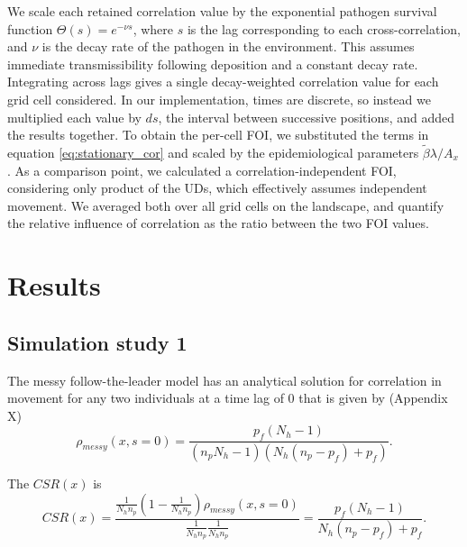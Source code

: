 \documentclass[letterpaper]{article}
\begin{document}
We scale each retained correlation value by the exponential pathogen survival function $\Theta(s) = e^{-\nu s}$, where $s$ is the lag corresponding to each cross-correlation, and $\nu$ is the decay rate of the pathogen in the environment. This assumes immediate transmissibility following deposition and a constant decay rate. Integrating across lags gives a single decay-weighted correlation value for each grid cell considered. In our implementation, times are discrete, so instead we multiplied each value by $ds$, the interval between successive positions, and added the results together. To obtain the per-cell FOI, we substituted the terms in equation \ref{eq:stationary_cor} and scaled by the epidemiological parameters $\tilde\beta\lambda/ A_x$. As a comparison point, we calculated a correlation-independent FOI, considering only product of the UDs, which effectively assumes independent movement. We averaged both over all grid cells on the landscape, and quantify the relative influence of correlation as the ratio between the two FOI values. %

\section*{Results}

\subsection*{Simulation study 1}

The messy follow-the-leader model has an analytical solution for correlation in movement for any two individuals at a time lag of 0 that is given by (Appendix X)
\begin{equation}
    \rho_{messy}(x, s=0) = \frac{p_f(N_h - 1)}{(n_p N_h - 1)(N_h(n_p - p_f) + p_f)}.
    \label{eq:messy_leader}
\end{equation}

The $CSR(x)$ is
\begin{equation}
    CSR(x) = \frac{\frac{1}{N_h n_p}(1 - \frac{1}{N_h n_p})\rho_{messy}(x, s=0)}{\frac{1}{N_h n_p} \frac{1}{N_h n_p}} = \frac{p_f(N_h - 1)}{N_h(n_p - p_f) + p_f}.
    \label{eq:relative_contrib}
\end{equation}
\end{document}
